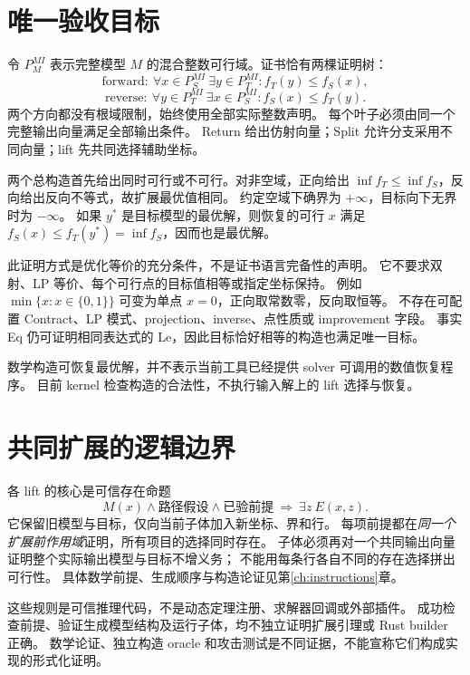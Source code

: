 \section{唯一验收目标}
\label{sec:directions}
\label{sec:contracts}
令 $P_M^{MI}$ 表示完整模型 $M$ 的混合整数可行域。证书恰有两棵证明树：
\[
 \mathrm{forward}:\ \forall x\in P_S^{MI}\ \exists y\in P_T^{MI}: f_T(y)\le f_S(x),
\]
\[
 \mathrm{reverse}:\ \forall y\in P_T^{MI}\ \exists x\in P_S^{MI}: f_S(x)\le f_T(y).
\]
两个方向都没有根域限制，始终使用全部实际整数声明。
每个叶子必须由同一个完整输出向量满足全部输出条件。
Return 给出仿射向量；Split 允许分支采用不同向量；lift 先共同选择辅助坐标。

两个总构造首先给出同时可行或不可行。对非空域，正向给出
$\inf f_T\le\inf f_S$，反向给出反向不等式，故扩展最优值相同。
约定空域下确界为 $+\infty$，目标向下无界时为 $-\infty$。
如果 $y^*$ 是目标模型的最优解，则恢复的可行 $x$ 满足
$f_S(x)\le f_T(y^*)=\inf f_S$，因而也是最优解。

此证明方式是优化等价的充分条件，不是证书语言完备性的声明。
它不要求双射、LP 等价、每个可行点的目标值相等或指定坐标保持。
例如 $\min\{x:x\in\{0,1\}\}$ 可变为单点 $x=0$，正向取常数零，反向取恒等。
不存在可配置 Contract、LP 模式、projection、inverse、点性质或 improvement 字段。
事实 Eq 仍可证明相同表达式的 Le，因此目标恰好相等的构造也满足唯一目标。

数学构造可恢复最优解，并不表示当前工具已经提供 solver 可调用的数值恢复程序。
目前 kernel 检查构造的合法性，不执行输入解上的 lift 选择与恢复。

\section{共同扩展的逻辑边界}
\label{sec:joint-extension-contract}

各 lift 的核心是可信存在命题
\[
 M(x)\land\text{路径假设}\land\text{已验前提}
 \ \Longrightarrow\ \exists z\ E(x,z).
\]
它保留旧模型与目标，仅向当前子体加入新坐标、界和行。
每项前提都在\emph{同一个扩展前作用域}证明，所有项目的选择同时存在。
子体必须再对一个共同输出向量证明整个实际输出模型与目标不增义务；
不能用每条行各自不同的存在选择拼出可行性。
具体数学前提、生成顺序与构造论证见第\ref{ch:instructions}章。

这些规则是可信推理代码，不是动态定理注册、求解器回调或外部插件。
成功检查前提、验证生成模型结构及运行子体，均不独立证明扩展引理或 Rust builder 正确。
数学论证、独立构造 oracle 和攻击测试是不同证据，不能宣称它们构成实现的形式化证明。
